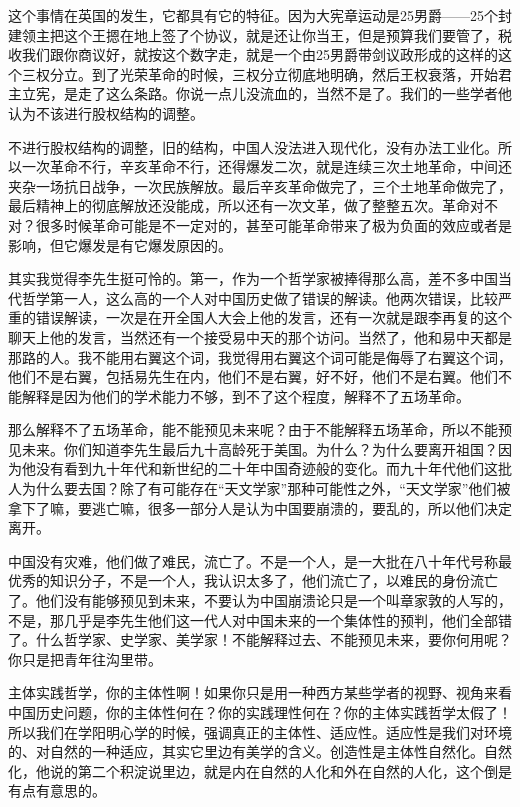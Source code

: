 \documentclass[UTF8, 12pt, a4paper]{ctexrep}
\begin{document}
这个事情在英国的发生，它都具有它的特征。因为大宪章运动是25男爵——25个封建领主把这个王摁在地上签了个协议，就是还让你当王，但是预算我们要管了，税收我们跟你商议好，就按这个数字走，就是一个由25男爵带剑议政形成的这样的这个三权分立。到了光荣革命的时候，三权分立彻底地明确，然后王权衰落，开始君主立宪，是走了这么条路。你说一点儿没流血的，当然不是了。我们的一些学者他认为不该进行股权结构的调整。

不进行股权结构的调整，旧的结构，中国人没法进入现代化，没有办法工业化。所以一次革命不行，辛亥革命不行，还得爆发二次，就是连续三次土地革命，中间还夹杂一场抗日战争，一次民族解放。最后辛亥革命做完了，三个土地革命做完了，最后精神上的彻底解放还没能成，所以还有一次文革，做了整整五次。革命对不对？很多时候革命可能是不一定对的，甚至可能革命带来了极为负面的效应或者是影响，但它爆发是有它爆发原因的。

其实我觉得李先生挺可怜的。第一，作为一个哲学家被捧得那么高，差不多中国当代哲学第一人，这么高的一个人对中国历史做了错误的解读。他两次错误，比较严重的错误解读，一次是在开全国人大会上他的发言，还有一次就是跟李再复的这个聊天上他的发言，当然还有一个接受易中天的那个访问。当然了，他和易中天都是那路的人。我不能用右翼这个词，我觉得用右翼这个词可能是侮辱了右翼这个词，他们不是右翼，包括易先生在内，他们不是右翼，好不好，他们不是右翼。他们不能解释是因为他们的学术能力不够，到不了这个程度，解释不了五场革命。

那么解释不了五场革命，能不能预见未来呢？由于不能解释五场革命，所以不能预见未来。你们知道李先生最后九十高龄死于美国。为什么？为什么要离开祖国？因为他没有看到九十年代和新世纪的二十年中国奇迹般的变化。而九十年代他们这批人为什么要去国？除了有可能存在“天文学家”那种可能性之外，“天文学家”他们被拿下了嘛，要逃亡嘛，很多一部分人是认为中国要崩溃的，要乱的，所以他们决定离开。

中国没有灾难，他们做了难民，流亡了。不是一个人，是一大批在八十年代号称最优秀的知识分子，不是一个人，我认识太多了，他们流亡了，以难民的身份流亡了。他们没有能够预见到未来，不要认为中国崩溃论只是一个叫章家敦的人写的，不是，那几乎是李先生他们这一代人对中国未来的一个集体性的预判，他们全部错了。什么哲学家、史学家、美学家！不能解释过去、不能预见未来，要你何用呢？你只是把青年往沟里带。

主体实践哲学，你的主体性啊！如果你只是用一种西方某些学者的视野、视角来看中国历史问题，你的主体性何在？你的实践理性何在？你的主体实践哲学太假了！所以我们在学阳明心学的时候，强调真正的主体性、适应性。适应性是我们对环境的、对自然的一种适应，其实它里边有美学的含义。创造性是主体性自然化。自然化，他说的第二个积淀说里边，就是内在自然的人化和外在自然的人化，这个倒是有点有意思的。
\end{document}
